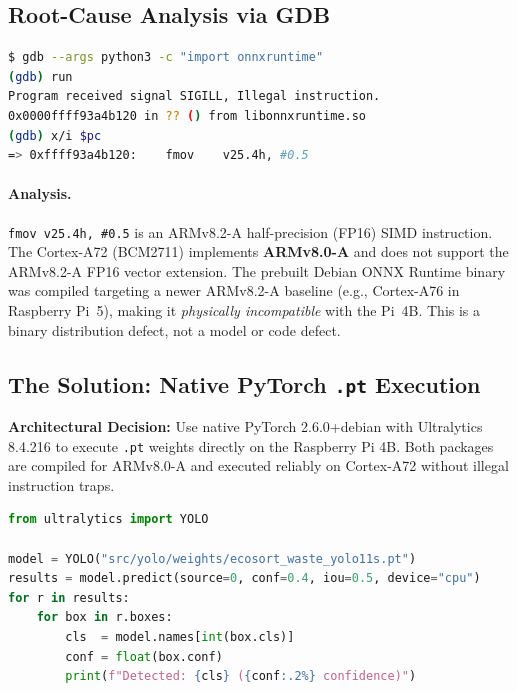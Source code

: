 \documentclass[12pt,a4paper]{article}
\begin{document}
\subsection{Root-Cause Analysis via GDB}

\begin{lstlisting}[language=bash, caption={GDB session identifying the illegal FP16 instruction}]
$ gdb --args python3 -c "import onnxruntime"
(gdb) run
Program received signal SIGILL, Illegal instruction.
0x0000ffff93a4b120 in ?? () from libonnxruntime.so
(gdb) x/i $pc
=> 0xffff93a4b120:    fmov    v25.4h, #0.5
\end{lstlisting}

\paragraph{Analysis.}
\texttt{fmov v25.4h, \#0.5} is an ARMv8.2-A half-precision (FP16) SIMD instruction.
The Cortex-A72 (BCM2711) implements \textbf{ARMv8.0-A} and does not support the
ARMv8.2-A FP16 vector extension. The prebuilt Debian ONNX Runtime binary was compiled
targeting a newer ARMv8.2-A baseline (e.g., Cortex-A76 in Raspberry Pi~5), making it
\textit{physically incompatible} with the Pi~4B. This is a binary distribution defect,
not a model or code defect.

\subsection{The Solution: Native PyTorch \texttt{.pt} Execution}

\begin{tcolorbox}[enhanced,colback=ecosortgreen!5,colframe=ecosortgreen,
  boxrule=1.5pt,arc=6pt,top=6pt,bottom=6pt,left=8pt,right=8pt]
\textbf{Architectural Decision:} Use native PyTorch 2.6.0+debian with Ultralytics 8.4.216
to execute \texttt{.pt} weights directly on the Raspberry Pi 4B. Both packages are compiled
for ARMv8.0-A and executed reliably on Cortex-A72 without illegal instruction traps.
\end{tcolorbox}

\begin{lstlisting}[language=python, caption={Native PyTorch YOLO11s inference on Raspberry Pi 4B}]
from ultralytics import YOLO

model = YOLO("src/yolo/weights/ecosort_waste_yolo11s.pt")
results = model.predict(source=0, conf=0.4, iou=0.5, device="cpu")
for r in results:
    for box in r.boxes:
        cls  = model.names[int(box.cls)]
        conf = float(box.conf)
        print(f"Detected: {cls} ({conf:.2%} confidence)")
\end{lstlisting}
\end{document}
